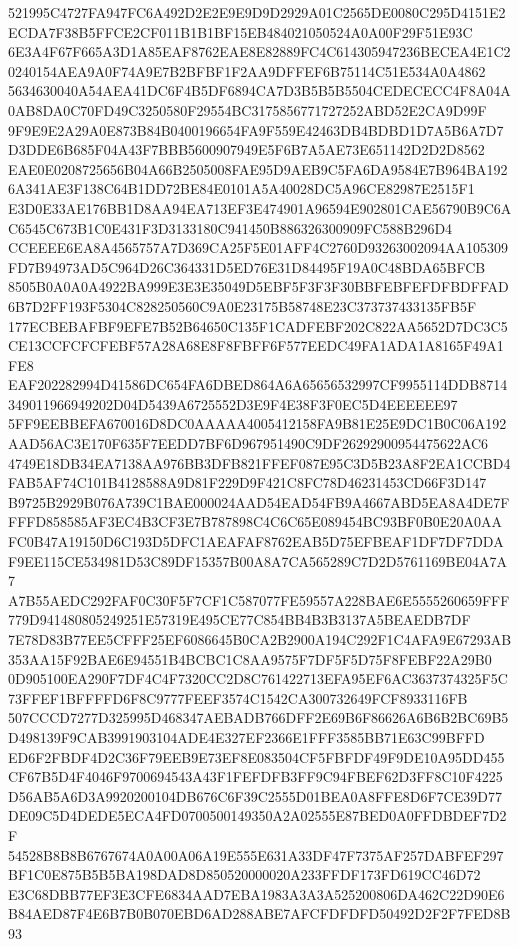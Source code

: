 \documentclass[UTF8,fontset=fandol,zihao=-4,a4paper]{ctexart}
\begin{document}
{{521995C4727FA947FC6A492D2E2E9E9D9D2929A01C2565DE0080C295D4151E2ECDA7F38B5FFCE2CF011B1B1BF15EB484021050524A0A00F29F51E93C
6E3A4F67F665A3D1A85EAF8762EAE8E82889FC4C614305947236BECEA4E1C20240154AEA9A0F74A9E7B2BFBF1F2AA9DFFEF6B75114C51E534A0A4862
5634630040A54AEA41DC6F4B5DF6894CA7D3B5B5B5504CEDECECC4F8A04A0AB8DA0C70FD49C3250580F29554BC3175856771727252ABD52E2CA9D99F
9F9E9E2A29A0E873B84B0400196654FA9F559E42463DB4BDBD1D7A5B6A7D7D3DDE6B685F04A43F7BBB5600907949E5F6B7A5AE73E651142D2D2D8562
EAE0E0208725656B04A66B2505008FAE95D9AEB9C5FA6DA9584E7B964BA1926A341AE3F138C64B1DD72BE84E0101A5A40028DC5A96CE82987E2515F1
E3D0E33AE176BB1D8AA94EA713EF3E474901A96594E902801CAE56790B9C6AC6545C673B1C0E431F3D3133180C941450B886326300909FC588B296D4
CCEEEE6EA8A4565757A7D369CA25F5E01AFF4C2760D93263002094AA105309FD7B94973AD5C964D26C364331D5ED76E31D84495F19A0C48BDA65BFCB
8505B0A0A0A4922BA999E3E3E35049D5EBF5F3F3F30BBFEBFEFDFBDFFAD6B7D2FF193F5304C828250560C9A0E23175B58748E23C373737433135FB5F
177ECBEBAFBF9EFE7B52B64650C135F1CADFEBF202C822AA5652D7DC3C5CE13CCFCFCFEBF57A28A68E8F8FBFF6F577EEDC49FA1ADA1A8165F49A1FE8
EAF202282994D41586DC654FA6DBED864A6A65656532997CF9955114DDB8714349011966949202D04D5439A6725552D3E9F4E38F3F0EC5D4EEEEEE97
5FF9EEBBEFA670016D8DC0AAAAA4005412158FA9B81E25E9DC1B0C06A192AAD56AC3E170F635F7EEDD7BF6D967951490C9DF26292900954475622AC6
4749E18DB34EA7138AA976BB3DFB821FFEF087E95C3D5B23A8F2EA1CCBD4FAB5AF74C101B4128588A9D81F229D9F421C8FC78D46231453CD66F3D147
B9725B2929B076A739C1BAE000024AAD54EAD54FB9A4667ABD5EA8A4DE7FFFFD858585AF3EC4B3CF3E7B787898C4C6C65E089454BC93BF0B0E20A0AA
FC0B47A19150D6C193D5DFC1AEAFAF8762EAB5D75EFBEAF1DF7DF7DDAF9EE115CE534981D53C89DF15357B00A8A7CA565289C7D2D5761169BE04A7A7
A7B55AEDC292FAF0C30F5F7CF1C587077FE59557A228BAE6E5555260659FFF779D941480805249251E57319E495CE77C854BB4B3B3137A5BEAEDB7DF
7E78D83B77EE5CFFF25EF6086645B0CA2B2900A194C292F1C4AFA9E67293AB353AA15F92BAE6E94551B4BCBC1C8AA9575F7DF5F5D75F8FEBF22A29B0
0D905100EA290F7DF4C4F7320CC2D8C761422713EFA95EF6AC3637374325F5C73FFEF1BFFFFD6F8C9777FEEF3574C1542CA300732649FCF8933116FB
507CCCD7277D325995D468347AEBADB766DFF2E69B6F86626A6B6B2BC69B5D498139F9CAB3991903104ADE4E327EF2366E1FFF3585BB71E63C99BFFD
ED6F2FBDF4D2C36F79EEB9E73EF8E083504CF5FBFDF49F9DE10A95DD455CF67B5D4F4046F9700694543A43F1FEFDFB3FF9C94FBEF62D3FF8C10F4225
D56AB5A6D3A9920200104DB676C6F39C2555D01BEA0A8FFE8D6F7CE39D77DE09C5D4DEDE5ECA4FD0700500149350A2A02555E87BED0A0FFDBDEF7D2F
54528B8B8B6767674A0A00A06A19E555E631A33DF47F7375AF257DABFEF297BF1C0E875B5B5BA198DAD8D850520000020A233FFDF173FD619CC46D72
E3C68DBB77EF3E3CFE6834AAD7EBA1983A3A3A525200806DA462C22D90E6B84AED87F4E6B7B0B070EBD6AD288ABE7AFCFDFDFD50492D2F2F7FED8B93
}}
\end{document}
